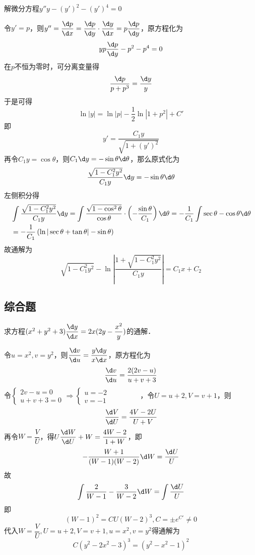 \documentclass[12pt, a4paper, oneside, UTF8]{ctexbook}
\begin{document}
\begin{exercise}
    解微分方程$y''y-\left(y'\right)^2-\left(y'\right)^4=0$
\end{exercise}
\begin{solution}
    令$y'=p$，则$y''=\dfrac{\d p}{\d x}=\dfrac{\d p}{\d y}\cdot \dfrac{\d y}{\d x}=p \dfrac{\d p}{\d y}$，原方程化为
    \[y p \dfrac{\d p}{\d y} - p^2 - p^4 = 0\]
    在$p$不恒为零时，可分离变量得
    \[\dfrac{\d p}{p + p^3} = \dfrac{\d y}{y}\]
    于是可得
    \[\ln |y| = \ln |p| - \dfrac{1}{2} \ln |1 + p^2| + C'\]
    即
    \[y' = \dfrac{C_1 y}{\sqrt{1 + (y')^2}}\]
    再令$C_1y = \cos \theta$，则$C_1\d y= -\sin \theta \d \theta$，那么原式化为
    \[\frac{\sqrt{1-C_1^2y^2}}{C_1y}\d y=-\sin \theta \d \theta\]
    左侧积分得
    \begin{align*}
        &\displaystyle\int \dfrac{\sqrt{1-C_1^2y^2}}{C_1y}\d y 
        = \int \dfrac{\sqrt{1-\cos^2 \theta}}{\cos \theta} \cdot \left(-\dfrac{\sin \theta}{C_1}\right) \d \theta 
        = -\dfrac{1}{C_1} \int \sec \theta - \cos \theta \d \theta\\
        &= -\dfrac{1}{C_1} \left( \ln |\sec \theta + \tan \theta| - \sin \theta \right)
    \end{align*}
    故通解为
    \[\boxed{\sqrt{1-C_1^2y^2}-\ln\left|\dfrac{1+\sqrt{1-C_1^2y^2}}{C_1y}\right| = C_1x+C_2}\]
\end{solution}

\subsection{综合题}

\begin{exercise}
    求方程$(x^2+y^2+3) \dfrac{\d y}{\d x} = 2x(2y - \dfrac{x^2}{y})$的通解．
\end{exercise}
\begin{solution}
    令$u=x^2,v=y^2$，则$\dfrac{\d v}{\d u}=\dfrac{y \d y}{x \d x}$，原方程化为
    \[\dfrac{\d v}{\d u}=\dfrac{2(2v - u)}{u+v+3}\]
    令$\begin{cases}
        2v-u=0\\
        u+v+3=0
    \end{cases}\Rightarrow
    \begin{cases}
        u=-2\\
        v=-1
    \end{cases}\qquad\qquad$
    ，令$U=u+2,V=v+1$，则
    \[\dfrac{\d V}{\d U}=\dfrac{4V-2U}{U+V}\]
    再令$W=\dfrac{V}{U}$，得$U \dfrac{\d W}{\d U} + W = \dfrac{4W - 2}{1 + W}$，即
    \[-\dfrac{W+1}{(W-1)(W-2)} \d W = \dfrac{\d U}{U}\]
    故
    \[\int \dfrac{2}{W-1}-\dfrac{3}{W-2}\d W = \int \dfrac{\d U}{U}\]
    即
    \[(W-1)^2=CU(W-2)^3,C=\pm e^{C'}\neq 0\]
    代入$W=\dfrac{V}{U},U=u+2,V=v+1,u=x^2,v=y^2$得通解为
    \[\boxed{C(y^2-2x^2-3)^3=(y^2 - x^2 -1)^2}\]
\end{solution}
\end{document}
